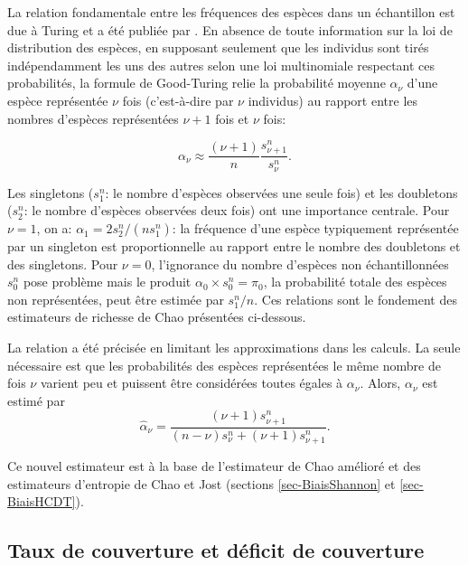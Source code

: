 \documentclass[
  11pt,
  french,
  a4paper,
  extrafontsizes,onecolumn,openright
  ]{memoir}
\begin{document}
La relation fondamentale entre les fréquences des espèces dans un échantillon est due à Turing et a été publiée par \textcite{Good1953}.
En absence de toute information sur la loi de distribution des espèces, en supposant seulement que les individus sont tirés indépendamment les uns des autres selon une loi multinomiale respectant ces probabilités, la formule de Good-Turing relie la probabilité moyenne \(\alpha_\nu\) d'une espèce représentée \(\nu\) fois (c'est-à-dire par \(\nu\) individus) au rapport entre les nombres d'espèces représentées \(\nu+1\) fois et \(\nu\) fois:

\begin{equation}
  \label{eq:alphanu}
  \alpha_\nu \approx \frac{(\nu+1)}{n} \frac{s^{n}_{\nu+1}}{s^{n}_{\nu}}.
\end{equation}

Les singletons (\(s^{n}_{1}\): le nombre d'espèces observées une seule fois) et les doubletons (\(s^{n}_{2}\): le nombre d'espèces observées deux fois) ont une importance centrale.
Pour \(\nu=1\), on a: \(\alpha_1 = 2 s^{n}_{2}/(ns^{n}_{1})\): la fréquence d'une espèce typiquement représentée par un singleton est proportionnelle au rapport entre le nombre des doubletons et des singletons.
Pour \(\nu=0\), l'ignorance du nombre d'espèces non échantillonnées \(s^{n}_{0}\) pose problème mais le produit \(\alpha_0 \times s^{n}_{0} = \pi_0\), la probabilité totale des espèces non représentées, peut être estimée par \(s^{n}_{1}/n\).
Ces relations sont le fondement des estimateurs de richesse de Chao présentées ci-dessous.

La relation a été précisée \autocite[eq. 6 et 7a]{Chiu2014a} en limitant les approximations dans les calculs.
La seule nécessaire est que les probabilités des espèces représentées le même nombre de fois \(\nu\) varient peu et puissent être considérées toutes égales à \(\alpha_\nu\).
Alors, \(\alpha_\nu\) est estimé par
\begin{equation}
  \label{eq:GoodTuring2014}
  \hat{\alpha}_\nu = \frac{\left(\nu+1 \right) s^{n}_{\nu+1}}{\left(n-\nu \right) s^{n}_{\nu} + \left(\nu+1 \right) s^{n}_{\nu+1}}.
\end{equation}

Ce nouvel estimateur est à la base de l'estimateur de Chao amélioré et des estimateurs d'entropie de Chao et Jost (sections \ref{sec-BiaisShannon} et \ref{sec-BiaisHCDT}).

\hypertarget{taux-de-couverture-et-duxe9ficit-de-couverture}{%
\subsection{Taux de couverture et déficit de couverture}\label{taux-de-couverture-et-duxe9ficit-de-couverture}}
\end{document}

